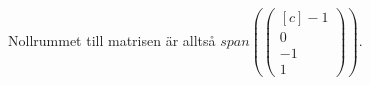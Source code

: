 \documentclass[../../main.tex]{subfiles}
\begin{document}
\begin{solution}{17}
    Nollrummet till matrisen är alltså $span({\begin{pmatrix}[c]
                    -1 \\
                    0  \\
                    -1 \\
                    1
                \end{pmatrix}})$.





\end{solution}
\end{document}

